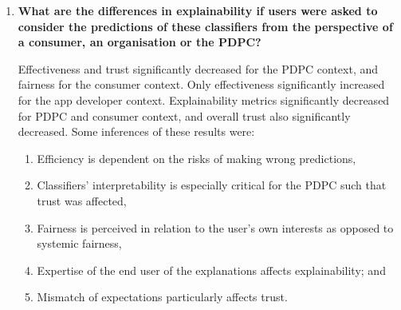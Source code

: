 \begin{enumerate}
    \item \textbf{What are the differences in explainability if users were asked to consider the predictions of these classifiers from the perspective of a consumer, an organisation or the PDPC?}
    
    Effectiveness and trust significantly decreased for the PDPC context, and fairness for the consumer context. Only effectiveness significantly increased for the app developer context. Explainability metrics significantly decreased for PDPC and consumer context, and overall trust also significantly decreased. Some inferences of these results were:
    \begin{enumerate}
        \item Efficiency is dependent on the risks of making wrong predictions,
        \item Classifiers' interpretability is especially critical for the PDPC such that trust was affected,
        \item Fairness is perceived in relation to the user's own interests as opposed to systemic fairness,
        \item Expertise of the end user of the explanations affects explainability; and
        \item Mismatch of expectations particularly affects trust.
    \end{enumerate}
\end{enumerate}

